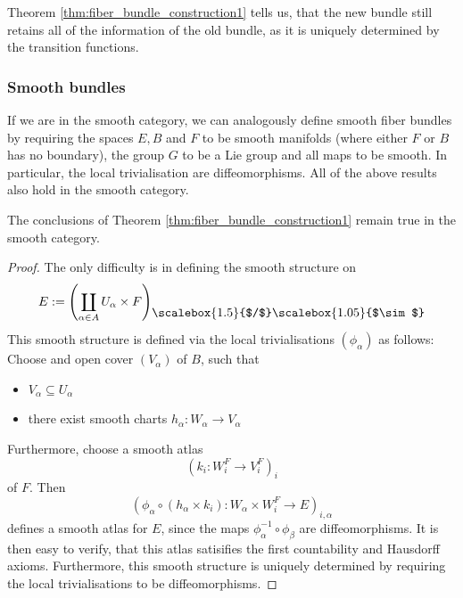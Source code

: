     Theorem \ref{thm:fiber_bundle_construction1} tells us, that the new bundle still retains all of the information of the old bundle, as it is uniquely determined by the transition functions.

    \subsubsection{Smooth bundles}

    \noindent If we are in the smooth category, we can analogously define smooth fiber bundles by requiring the spaces $E ,B$ and $F$ to be smooth manifolds (where either $F$ or $B$ has no boundary), the group $G$ to be a Lie group and all maps to be smooth. In particular, the local trivialisation are diffeomorphisms. All of the above results also hold in the smooth category. 

    \begin{theorem}
        The conclusions of Theorem \ref{thm:fiber_bundle_construction1} remain true in the smooth category. 
    \end{theorem}
    \begin{proof}
        The only difficulty is in defining the smooth structure on 
        \[
            E := \left( \coprod_{\alpha \in A} U_\alpha \times F \right)_{\raisebox{5pt}{\scalebox{1.5}{$/$}}\raisebox{5pt}{\scalebox{1.05}{$\sim$}}}
        \]
        This smooth structure is defined via the local trivialisations $(\phi_\alpha)$ as follows: Choose and open cover $(V_\alpha)$ of $B$, such that
        \begin{itemize}
            \item $V_\alpha \subseteq U_\alpha$
            \item there exist smooth charts $h_\alpha \colon W_\alpha \to V_\alpha$
        \end{itemize}
        Furthermore, choose a smooth atlas
        \[
        (k_i \colon W_i^F \to V_i^F)_i
        \]
        of $F$. Then 
        \[
        (\phi_\alpha \circ (h_\alpha \times k_i) \colon W_\alpha \times W_i^F \to E)_{i,\alpha}
        \]
        defines a smooth atlas for $E$, since the maps $\phi_\alpha^{-1} \circ \phi_\beta$ are diffeomorphisms. It is then easy to verify, that this atlas satisifies the first countability and Hausdorff axioms. Furthermore, this smooth structure is uniquely determined by requiring the local trivialisations to be diffeomorphisms.
    \end{proof}

